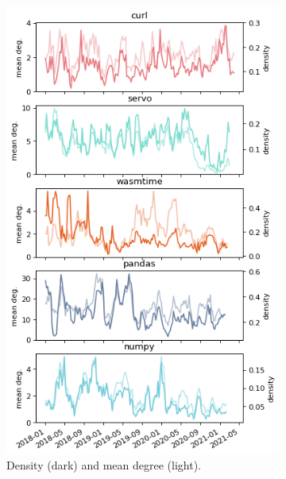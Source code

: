 \begin{figure}
    \centering
    \begin{subfigure}{0.53\textwidth}
        \centering
        \includegraphics[width=\textwidth]{figures/qualitative/mean_deg_density/mean_deg.png}
        \caption{Density (dark) and mean degree (light).}
        \label{fig:density_a}
    \end{subfigure}
    \begin{subfigure}{0.46\textwidth}
        \centering

\end{subfigure}
\end{figure}
